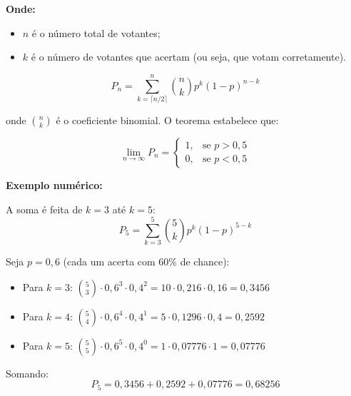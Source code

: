 \vspace{0.2cm}
\noindent\textbf{Onde:}
\begin{itemize}
    \item $n$ é o número total de votantes;
    \item $k$ é o número de votantes que acertam (ou seja, que votam corretamente).
\end{itemize}
\vspace{-0.2cm}

\begin{equation}
    P_n = \sum_{k=\lceil n/2 \rceil}^{n} \binom{n}{k} p^k (1-p)^{n-k}
    \label{eq:condorcet}
\end{equation}

\noindent onde $\binom{n}{k}$ é o coeficiente binomial. O teorema estabelece que:

\begin{equation}
    \lim_{n \to \infty} P_n =
    \begin{cases}
        1, & \text{se } p > 0{,}5 \\
        0, & \text{se } p < 0{,}5
    \end{cases}
    \label{eq:condorcet-limite}
\end{equation}

    \vspace{0.2cm}
    \noindent\textbf{Exemplo numérico:}

    A soma é feita de $k = 3$ até $k = 5$:
    \begin{equation*}
        P_5 = \sum_{k=3}^{5} \binom{5}{k} p^k (1-p)^{5-k}
    \end{equation*}

    Seja $p = 0{,}6$ (cada um acerta com 60\% de chance):
    \begin{itemize}
        \item Para $k = 3$: $\binom{5}{3} \cdot 0{,}6^3 \cdot 0{,}4^2 = 10 \cdot 0{,}216 \cdot 0{,}16 = 0{,}3456$
        \item Para $k = 4$: $\binom{5}{4} \cdot 0{,}6^4 \cdot 0{,}4^1 = 5 \cdot 0{,}1296 \cdot 0{,}4 = 0{,}2592$
        \item Para $k = 5$: $\binom{5}{5} \cdot 0{,}6^5 \cdot 0{,}4^0 = 1 \cdot 0{,}07776 \cdot 1 = 0{,}07776$
    \end{itemize}

    Somando:
    \begin{equation*}
        P_5 = 0{,}3456 + 0{,}2592 + 0{,}07776 = 0{,}68256
    \end{equation*}


